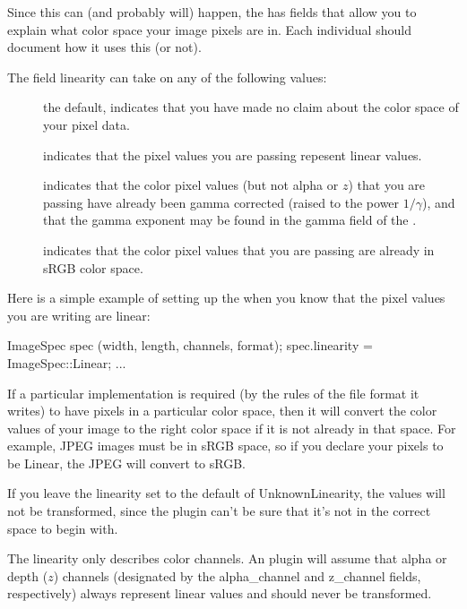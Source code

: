 Since this can (and probably will) happen, the \ImageSpec has
fields that allow you to explain what color space your image pixels are
in.  Each individual \ImageOutput should document how it uses this (or
not).

The \ImageSpec field {\cf linearity} can take on any of the
following values:
\begin{description}
\item[\halfspc \rm {}] the default,
  indicates that you have made no claim about the color space of your
  pixel data.
\item[\halfspc \rm {}] indicates that the pixel
  values you are passing repesent linear values.
\item[\halfspc \rm {}] indicates that the
  color pixel values (but not alpha or $z$) that you are passing have
  already been gamma corrected (raised to the power $1/\gamma$), and
  that the gamma exponent may be found in the {\cf gamma} field of the
  \ImageSpec.
\item[\halfspc \rm {}] indicates that the color pixel
  values that you are passing are already in sRGB color space.
\end{description}

\noindent Here is a simple example of setting up the \ImageSpec
when you know that the pixel values you are writing are linear:

\begin{code}
        ImageSpec spec (width, length, channels, format);
        spec.linearity = ImageSpec::Linear;
        ...
\end{code}

If a particular \ImageOutput implementation is required (by the rules of
the file format it writes) to have pixels in a particular color space,
then it will convert the color values of your image to the right color
space if it is not already in that space.  For example, JPEG images
must be in sRGB space, so if you declare your pixels to be {\kw Linear},
the JPEG \ImageOutput will convert to sRGB.

If you leave the linearity set to the default of {\cf UnknownLinearity},
the values will not be transformed, since the plugin can't be sure that
it's not in the correct space to begin with.  

The linearity only describes color channels.  An \ImageOutput plugin
will assume that alpha or depth ($z$) channels (designated by the {\cf
  alpha_channel} and {\cf z_channel} fields, respectively) always
represent linear values and should never be transformed.


